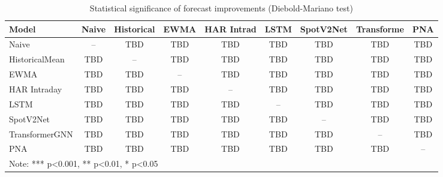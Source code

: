 \documentclass[journal]{IEEEtran}
\begin{document}
\begin{table}[!t]
\centering
\caption{Statistical significance of forecast improvements (Diebold-Mariano test)}
\label{tab:statistical_tests}
\begin{tabular}{lcccccccc}
\toprule
Model & Naive & Historical & EWMA & HAR Intrad & LSTM & SpotV2Net & Transforme & PNA \\
\midrule
Naive & -- & TBD & TBD & TBD & TBD & TBD & TBD & TBD \\
HistoricalMean & TBD & -- & TBD & TBD & TBD & TBD & TBD & TBD \\
EWMA & TBD & TBD & -- & TBD & TBD & TBD & TBD & TBD \\
HAR Intraday & TBD & TBD & TBD & -- & TBD & TBD & TBD & TBD \\
LSTM & TBD & TBD & TBD & TBD & -- & TBD & TBD & TBD \\
SpotV2Net & TBD & TBD & TBD & TBD & TBD & -- & TBD & TBD \\
TransformerGNN & TBD & TBD & TBD & TBD & TBD & TBD & -- & TBD \\
PNA & TBD & TBD & TBD & TBD & TBD & TBD & TBD & -- \\
\bottomrule
\multicolumn{9}{l}{\footnotesize Note: *** p<0.001, ** p<0.01, * p<0.05}
\end{tabular}
\end{table}
\end{document}
